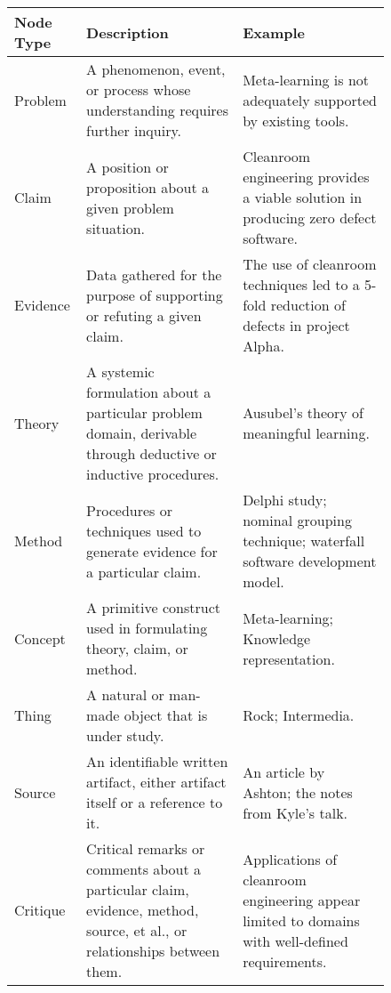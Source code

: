 \newpage
{}
\small
\begin{figure}[h]
  \begin{center}
    \begin{tabular} {|l|p{2.5in}|p{2.5in}|} \hline   
      {\bf Node Type} & {\bf Description} & {\bf Example} \\ \hline \hline
      
      Problem & A phenomenon, event, or process whose understanding
      requires further inquiry. & Meta-learning is not adequately
      supported by existing tools. \\ \hline
      
      Claim & A position or proposition about a given problem
      situation.  & Cleanroom engineering provides a viable solution
      in producing zero defect software. \\ \hline
      
      Evidence & Data gathered for the purpose of supporting or
      refuting a given claim. & The use of cleanroom techniques led
      to a 5-fold reduction of defects in project Alpha. \\
      \hline 

      Theory & A systemic formulation about a particular problem
      domain, derivable through deductive or inductive procedures. &
      Ausubel's theory of meaningful learning. \\ \hline
      
      Method & Procedures or techniques used to generate evidence for
      a particular claim. & Delphi study; nominal grouping technique;
      waterfall software development model. \\ \hline
      
      Concept & A primitive construct used in formulating theory,
      claim, or method. & Meta-learning; Knowledge representation.
      \\ \hline
      
      Thing & A natural or man-made object that is under study.  &
      Rock; Intermedia.  \\ \hline
      
      Source & An identifiable written artifact, either artifact
      itself or a reference to it. & An
      article by Ashton; the notes from Kyle's talk. \\ \hline 
      
      Critique & Critical remarks or comments about a particular
      claim, evidence, method, source, et al., or relationships
      between them. & Applications of cleanroom
      engineering appear limited to domains with well-defined requirements.
      \\ \hline
      

\end{tabular}
\end{center}
\end{figure}
